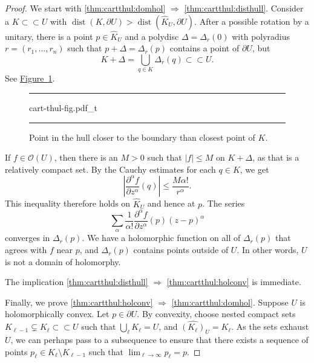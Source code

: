 \documentclass[12pt,openany]{book}
\newcommand{\sabs}[1]{\lvert {#1} \rvert}
\newcommand{\abs}[1]{\left\lvert {#1} \right\rvert}
\newcommand{\sO}{{\mathscr{O}}}
\theoremstyle{plain}
\theoremstyle{remark}
\theoremstyle{definition}
\newenvironment{myfig}{%
\begin{figure}[h!t]
\noindent\rule{\textwidth}{0.5pt}\vspace{12pt}\par\centering}%
{\par\noindent\rule{\textwidth}{0.5pt}
\end{figure}}
\theoremstyle{exercise}
\theoremstyle{example}
\newcommand{\figureref}[1]{\hyperref[#1]{Figure~\ref*{#1}}}
\begin{document}
\begin{proof}
We start with \ref{thm:cartthul:domhol} $\Rightarrow$
\ref{thm:cartthul:disthull}.
Consider a $K \subset
\subset U$ with $\operatorname{dist}(K,\partial U) > \operatorname{dist}(\widehat{K}_U,\partial U)$.
After a possible rotation by a unitary,
there is a point $p \in \widehat{K}_U$ and a polydisc
$\Delta = \Delta_r(0)$ with polyradius $r = (r_1,\ldots,r_n)$ such that
$p + \Delta = \Delta_r(p)$ contains a point of $\partial U$, but
\begin{equation*}
K + \Delta = \bigcup_{q \in K} \Delta_r(q) \subset \subset U.
\end{equation*}
See \figureref{fig:cart-thul-fig}.

\begin{myfig}
{cart-thul-fig.pdf_t}
\caption{Point in the hull closer to the boundary than closest
point of $K$.\label{fig:cart-thul-fig}}
\end{myfig}

If $f \in \sO(U)$, then there is an $M > 0$ such that $\sabs{f} \leq M$ on
$K + \Delta$, as that is a relatively compact set.  By the Cauchy estimates
for each $q \in K$, we get
\begin{equation*}
\abs{\frac{\partial^\alpha f}{\partial z^\alpha}(q)} \leq \frac{M
\alpha!}{r^\alpha} .
\end{equation*}
This inequality therefore holds on $\widehat{K}_U$ and hence at $p$.
The series
\begin{equation*}
\sum_{\alpha}
\frac{1}{\alpha !}\frac{\partial^\alpha f}{\partial z^\alpha}(p) {(z-p)}^\alpha
\end{equation*}
converges in $\Delta_r(p)$.  We have a holomorphic function
on all of $\Delta_r(p)$ that agrees with $f$ near $p$, and
$\Delta_r(p)$ contains points outside of $U$.
In other words, $U$ is not a domain of holomorphy.

The implication \ref{thm:cartthul:disthull} $\Rightarrow$
\ref{thm:cartthul:holconv} is immediate.

Finally, we prove
\ref{thm:cartthul:holconv} $\Rightarrow$
\ref{thm:cartthul:domhol}.
Suppose $U$ is holomorphically convex.  Let $p \in \partial U$.
By convexity, choose nested compact sets $K_{\ell-1} \subsetneq K_\ell \subset
\subset U$ such that $\bigcup_\ell K_\ell = U$, and $\widehat{(K_\ell)}_U =
K_\ell$.
As the sets exhaust $U$, we can perhaps pass to a subsequence
to ensure that
there exists a
sequence of points $p_\ell \in K_\ell \setminus K_{\ell-1}$ such that
$\lim_{\ell\to\infty} p_\ell = p$.


\end{proof}
\end{document}
